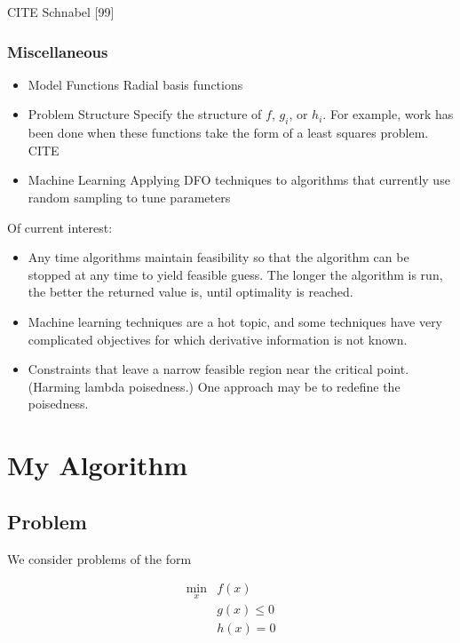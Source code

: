 \documentclass{article}
\begin{document}
CITE
Schnabel [99]


\subsubsection{Miscellaneous}

\begin{itemize}
\item Model Functions
	Radial basis functions
\item Problem Structure
	Specify the structure of $f$, $g_i$, or $h_i$. For example, work has been done when these functions take the form of a least squares problem. CITE
\item Machine Learning
	Applying DFO techniques to algorithms that currently use random sampling to tune parameters
\end{itemize}

Of current interest:
\begin{itemize}
\item Any time algorithms maintain feasibility so that the algorithm can be stopped at any time to yield feasible guess. The longer the algorithm is run, the better the returned value is, until optimality is reached.
\item Machine learning techniques are a hot topic, and some techniques have very complicated objectives for which derivative information is not known.
\item Constraints that leave a narrow feasible region near the critical point. (Harming lambda poisedness.) One approach may be to redefine the poisedness.
\end{itemize}





\section{My Algorithm}

\subsection{Problem}

We consider problems of the form

\begin{align*}
\min_x & f(x) \\
 & g(x) \le 0 \\
 & h(x) = 0
\end{align*}
\end{document}
